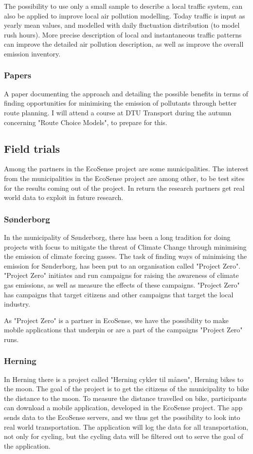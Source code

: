 The possibility to use only a small sample to describe a local traffic system, can also be applied to improve local air pollution modelling. Today traffic is input as yearly mean values, and modelled with daily fluctuation distribution (to model rush hours). More precise description of local and instantaneous traffic patterns can improve the detailed air pollution description, as well as improve the overall emission inventory. 

\subsubsection{Papers}
A paper documenting the approach and detailing the possible benefits in terms of finding opportunities for minimising the emission of pollutants through better route planning. I will attend a course at DTU Transport during the autumn concerning "Route Choice Models", to prepare for this.
\subsection{Field trials}
Among the partners in the EcoSense project are some municipalities. The interest from the municipalities in the EcoSense project are among other, to be test sites for the results coming out of the project. In return the research partners get real world data to exploit in future research.
\subsubsection{S\o nderborg}
In the municipality of S\o nderborg, there has been a long tradition for doing projects with focus to mitigate the threat of Climate Change through minimising the emission of climate forcing gasses. The task of finding ways of minimising the emission for S\o nderborg, has been put to an organisation called "Project Zero". "Project Zero" initiates and run campaigns for raising the awareness of climate gas emissions, as well as measure the effects of these campaigns. "Project Zero" has campaigns that target citizens and other campaigns that target the local industry.

As "Project Zero" is a partner in EcoSense, we have the possibility to make mobile applications that underpin or are a part of the campaigns "Project Zero" runs. 

\subsubsection{Herning}
In Herning there is a project called "Herning cykler til m\aa nen", Herning bikes to the moon. The goal of the project is to get the citizens of the municipality to bike the distance to the moon. To measure the distance travelled on bike, participants can download a mobile application, developed in the EcoSense project. The app sends data to the EcoSense servers, and we thus get the possibility to look into real world transportation. The application will log the data for all transportation, not only for cycling, but the cycling data will be filtered out to serve the goal of the application. 

